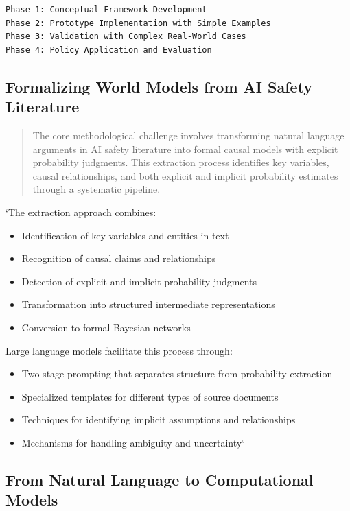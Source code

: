 \documentclass[
  11pt,
  letterpaper,
]{book}
\providecommand{\tightlist}{%
  \setlength{\itemsep}{0pt}\setlength{\parskip}{0pt}}
\begin{document}
\begin{verbatim}
Phase 1: Conceptual Framework Development
Phase 2: Prototype Implementation with Simple Examples  
Phase 3: Validation with Complex Real-World Cases
Phase 4: Policy Application and Evaluation
\end{verbatim}

\subsection{Formalizing World Models from AI Safety
Literature}\label{sec-formalizing-world-models}

\begin{quote}
The core methodological challenge involves transforming natural language
arguments in AI safety literature into formal causal models with
explicit probability judgments. This extraction process identifies key
variables, causal relationships, and both explicit and implicit
probability estimates through a systematic pipeline.
\end{quote}

`The extraction approach combines:

\begin{itemize}
\tightlist
\item
  Identification of key variables and entities in text
\item
  Recognition of causal claims and relationships
\item
  Detection of explicit and implicit probability judgments
\item
  Transformation into structured intermediate representations
\item
  Conversion to formal Bayesian networks
\end{itemize}

Large language models facilitate this process through:

\begin{itemize}
\tightlist
\item
  Two-stage prompting that separates structure from probability
  extraction
\item
  Specialized templates for different types of source documents
\item
  Techniques for identifying implicit assumptions and relationships
\item
  Mechanisms for handling ambiguity and uncertainty`
\end{itemize}

\subsection{From Natural Language to Computational
Models}\label{sec-natural-to-computational}
\end{document}
